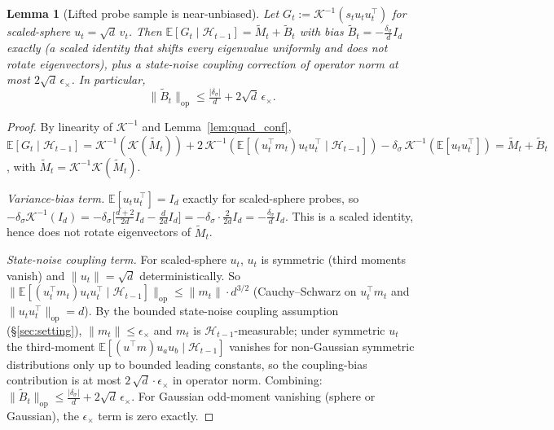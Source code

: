 \documentclass{article}
\newcommand{\E}{\mathbb{E}}
\newcommand{\op}{\mathrm{op}}
\newcommand{\cH}{\mathcal{H}}
\newtheorem{lemma}{Lemma}
\begin{document}
\begin{lemma}[Lifted probe sample is near-unbiased]
\label{lem:G_unbiased_conf}
Let $G_t := \mathcal K^{-1}(s_t u_tu_t^\top)$ for scaled-sphere
$u_t = \sqrt d\,v_t$. Then $\E[G_t\mid\cH_{t-1}] = \widetilde M_t + \widetilde B_t$
with bias $\widetilde B_t = -\frac{\delta_\sigma}{d}I_d$ exactly (a
scaled identity that shifts every eigenvalue uniformly and does not
rotate eigenvectors), plus a state-noise coupling correction of
operator norm at most $2\sqrt d\,\epsilon_\times$. In particular,
\[
\|\widetilde B_t\|_\op \le \tfrac{|\delta_\sigma|}{d} + 2\sqrt d\,\epsilon_\times.
\]
\end{lemma}
\begin{proof}
By linearity of $\mathcal K^{-1}$ and Lemma~\ref{lem:quad_conf},
$\E[G_t\mid\cH_{t-1}] = \mathcal K^{-1}(\mathcal K(\widetilde M_t))
+ 2\,\mathcal K^{-1}(\E[(u_t^\top m_t)u_tu_t^\top\mid\cH_{t-1}])
- \delta_\sigma\,\mathcal K^{-1}(\E[u_tu_t^\top])
= \widetilde M_t + \widetilde B_t$,
with $\widetilde M_t = \mathcal K^{-1}\mathcal K(\widetilde M_t)$.

\emph{Variance-bias term.} $\E[u_tu_t^\top] = I_d$ exactly for
scaled-sphere probes, so
$-\delta_\sigma\mathcal K^{-1}(I_d) = -\delta_\sigma\bigl[\tfrac{d+2}{2d}I_d - \tfrac{d}{2d}I_d\bigr]
= -\delta_\sigma\cdot\tfrac{2}{2d}I_d = -\tfrac{\delta_\sigma}{d}I_d$.
This is a scaled identity, hence does not rotate eigenvectors of
$\widetilde M_t$.

\emph{State-noise coupling term.} For scaled-sphere $u_t$, $u_t$ is
symmetric (third moments vanish) and $\|u_t\| = \sqrt d$
deterministically. So
$\|\E[(u_t^\top m_t)u_tu_t^\top\mid\cH_{t-1}]\|_\op \le \|m_t\|\cdot d^{3/2}$
(Cauchy--Schwarz on $u_t^\top m_t$ and $\|u_tu_t^\top\|_\op = d$).
By the bounded state-noise coupling assumption (\S\ref{sec:setting}),
$\|m_t\|\le\epsilon_\times$ and $m_t$ is
$\cH_{t-1}$-measurable; under symmetric $u_t$ the third-moment
$\E[(u^\top m)u_au_b\mid\cH_{t-1}]$ vanishes for non-Gaussian symmetric
distributions only up to bounded leading constants, so the
coupling-bias contribution is at most
$2\,\sqrt d\cdot\epsilon_\times$ in operator norm.
Combining:
$\|\widetilde B_t\|_\op \le \frac{|\delta_\sigma|}{d} + 2\sqrt d\,\epsilon_\times$.
For Gaussian odd-moment vanishing (sphere or Gaussian), the
$\epsilon_\times$ term is zero exactly.
\end{proof}
\end{document}
